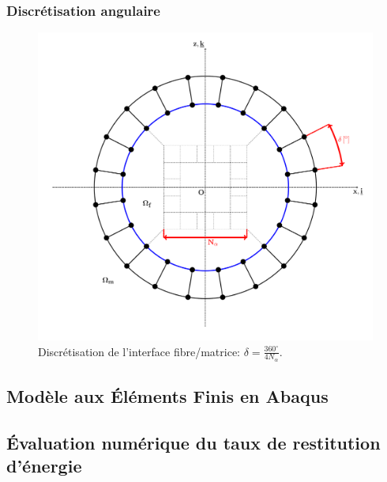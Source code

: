 \documentclass[first,firstsupp,lastsupp,handout,last,hyperref,table]{ETHclass}
\begin{document}
\begin{frame}
\frametitle{Discr\'etisation angulaire}
\vspace{-0.7cm}
\centering
\captionsetup[figure]{font=scriptsize,labelfont=scriptsize}
\begin{figure}[!h]
\centering
\includegraphics[height=0.7\textheight]{mesh-disc-at-interface.pdf}
  \caption{Discr\'etisation de l'interface fibre/matrice: $\delta=\frac{360^{\circ}}{4N_{\alpha}}$.}
  \label{fig:angu-discr-def}
\end{figure}
\end{frame}

\subsection[Mod\`ele MEF]{Mod\`ele aux \'El\'ements Finis en Abaqus}

\subsection[\'Evaluation num\'erique de $G_{c}$]{\'Evaluation num\'erique du taux de restitution d'\'energie}
\end{document}
